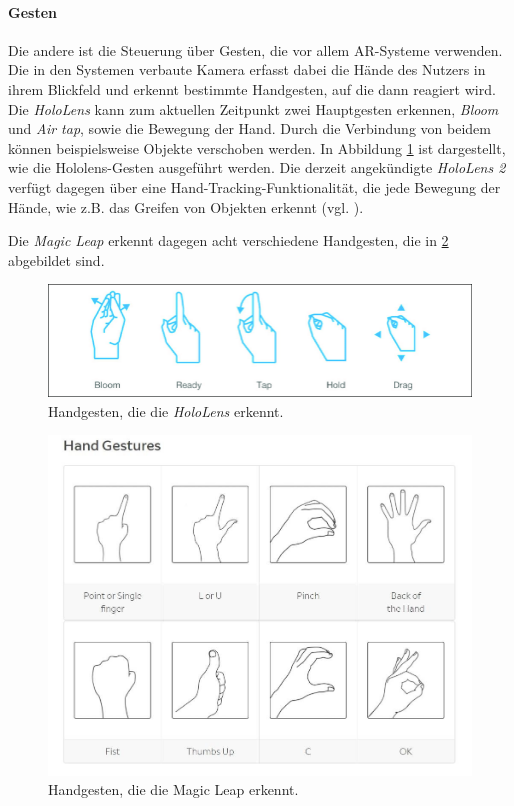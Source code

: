 \paragraph{Gesten}
Die andere ist die Steuerung über Gesten, die vor allem AR-Systeme verwenden.
Die in den Systemen verbaute Kamera erfasst dabei die Hände des Nutzers in ihrem Blickfeld und erkennt bestimmte Handgesten, auf die dann reagiert wird. 
Die \textit{HoloLens} kann zum aktuellen Zeitpunkt zwei Hauptgesten erkennen, \textit{Bloom} und \textit{Air tap}, sowie die Bewegung der Hand. Durch die Verbindung von beidem können beispielsweise Objekte verschoben werden. In Abbildung \ref{img:hololensGestures} ist dargestellt, wie die Hololens-Gesten ausgeführt werden. 
Die derzeit angekündigte \textit{HoloLens 2} verfügt dagegen über eine Hand-Tracking-Funktionalität, die jede Bewegung der Hände, wie z.B. das Greifen von Objekten erkennt (vgl. \cite{hololens2}). 

Die \textit{Magic Leap} erkennt dagegen acht verschiedene Handgesten, die in \ref{img:magicGestures} abgebildet sind. 


\begin{figure}[!htb]
	\centering
	\includegraphics[width=0.7\linewidth]{images/hololensGestures.png}
	\caption{Handgesten, die die \textit{HoloLens} erkennt.}
	\label{img:hololensGestures}
\end{figure}
\FloatBarrier

\begin{figure}[!htb]
	\centering
	\includegraphics[width=0.7\linewidth]{images/magicleapGestures.jpg}
	\caption{Handgesten, die die Magic Leap erkennt.}
	\label{img:magicGestures}
\end{figure}
\FloatBarrier

